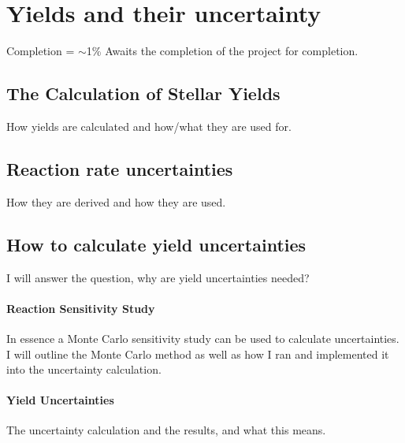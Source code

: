 \chapter{Yields and their uncertainty}

Completion = $\sim$1\%
Awaits the completion of the project for completion.

\section{The Calculation of Stellar Yields}

How yields are calculated and how/what they are used for.

\section{Reaction rate uncertainties}

How they are derived and how they are used.

\section{How to calculate yield uncertainties}

I will answer the question, why are yield uncertainties needed?

\subsubsection{Reaction Sensitivity Study}

In essence a Monte Carlo sensitivity study can be used to calculate uncertainties. I will outline the Monte Carlo method as well as how I ran and implemented it into the uncertainty calculation.

\subsubsection{Yield Uncertainties}

The uncertainty calculation and the results, and what this means.